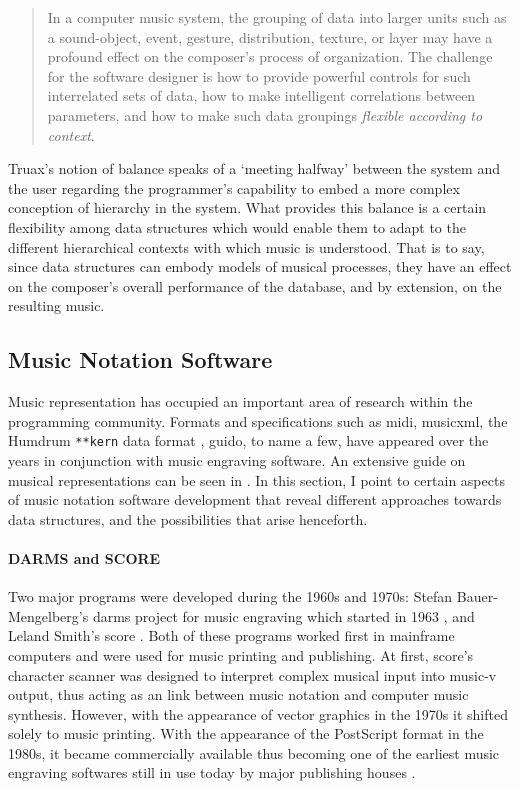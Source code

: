 \begin{quote}
	In a computer music system, the grouping of data into larger units such as a sound-object, event, gesture, distribution, texture, or layer may have a profound effect on the composer's process of organization. The challenge for the software designer is how to provide powerful controls for such interrelated sets of data, how to make intelligent correlations between parameters, and how to make such data groupings \textit{flexible according to context}. \im \parencite[157]{Emm86:The}
\end{quote}

Truax's notion of balance speaks of a `meeting halfway' between the system and the user regarding the programmer's capability to embed a more complex conception of hierarchy in the system. What provides this balance is a certain flexibility among data structures which would enable them to adapt to the different hierarchical contexts with which music is understood. That is to say, since data structures can embody models of musical processes, they have an effect on the composer's overall performance of the database, and by extension, on the resulting music. 

\subsection{Music Notation Software}
\label{applications:notation}

Music representation has occupied an important area of research within the programming community. Formats and specifications such as \gls{midi}, \gls{musicxml}, the Humdrum \texttt{**kern} data format \parencite{DBLP:conf/ismir/Sapp05}, \gls{guido}, to name a few, have appeared over the years in conjunction with music engraving software. An extensive guide on musical representations can be seen in \textcite{Selfridge-Field:1997:BMH:275928}. In this section, I point to certain aspects of music notation software development that reveal different approaches towards data structures, and the possibilities that arise henceforth.

\paragraph{DARMS and SCORE}
Two major programs were developed during the 1960s and 1970s: Stefan Bauer-Mengelberg's \gls{darms} project for music engraving which started in 1963 \parencites{icmc/bbp2372.1983.002}{10.2307/30204239}, and Leland Smith's  \gls{score} \parencite{smith1971}. Both of these programs worked first in mainframe computers and were used for music printing and publishing. At first, \gls{score}'s character scanner was designed to interpret complex musical input into \gls{music-v} output, thus acting as an link between music notation and computer music synthesis. However, with the appearance of vector graphics in the 1970s it shifted solely to music printing.  With the appearance of the PostScript format in the 1980s, it became commercially available thus becoming one of the earliest music engraving softwares still in use today by major publishing houses \parencite{scoremus}. 

